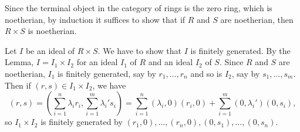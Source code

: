 Since the terminal object in the category of rings is the zero ring, which is
noetherian, by induction it suffices to show that if $R$ and $S$ are noetherian,
then $R \times S$ is noetherian.

Let $I$ be an ideal of $R \times S$. We have to show that $I$ is finitely generated.
By the Lemma, $I = I_1 \times I_2$ for an ideal $I_1$ of $R$ and an ideal
$I_2$ of $S$. Since $R$ and $S$ are noetherian, $I_1 $ is finitely generated, say
by $r_1, \ldots, r_n$ and so is $I_2$, say by $s_1, \ldots, s_m$. Then if
$(r, s) \in I_1\times I_2$, we have
\[ (r, s) = (\sum_{i = 1}^n \lambda_ir_i, \sum_{i = 1}^m\lambda_i's_i) = \sum_{i = 1}^n(\lambda_i, 0)(r_i, 0) + \sum_{i = 1}^m(0, \lambda_i')(0, s_i), \]
so $I_1\times I_2$ is finitely generated by $(r_1, 0), \ldots, (r_n, 0), (0, s_1), \ldots, (0, s_n)$.
